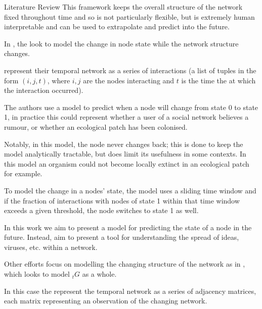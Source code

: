 \documentclass[12pt]{amsart}
\begin{document}
\begin{section}{Literature Review}
        This framework keeps the overall structure of the network fixed throughout time and so is not particularly flexible, but is extremely human interpretable and can be used to extrapolate and predict into the future. 

        In \cite{KARIMI20133476}\cite{KARIMI20133476}, the  look to model the change in node state while the network structure changes. 
        
         represent their temporal network as a series of interactions (a list of tuples in the form $(i,j,t)$, where $i,j$ are the nodes interacting and $t$ is the time the at which the interaction occurred). 
        
        The authors use a model to predict when a node will change from state 0 to state 1, in practice this could represent whether a user of a social network believes a rumour, or whether an ecological patch has been colonised. 
        
        Notably, in this model, the node never changes back; this is done to keep the model analytically tractable, but does limit its usefulness in some contexts. In this model an organism could not become locally extinct in an ecological patch for example. 
        
        To model the change in a nodes' state, the model uses a sliding time window and if the fraction of interactions with nodes of state 1 within that time window exceeds a given threshold, the node switches to state 1 as well. 

        In this work we aim to present a model for predicting the state of a node in the future. Instead,  aim to present a tool for understanding the spread of ideas, viruses, etc. within a network.



        Other efforts focus on modelling the changing structure of the network as in \cite{sanna2021link}, which looks to model $_t G$ as a whole.
        
        In this case the  represent the temporal network as a series of adjacency matrices, each matrix representing an observation of the changing network. 
        

\end{section}
\end{document}
